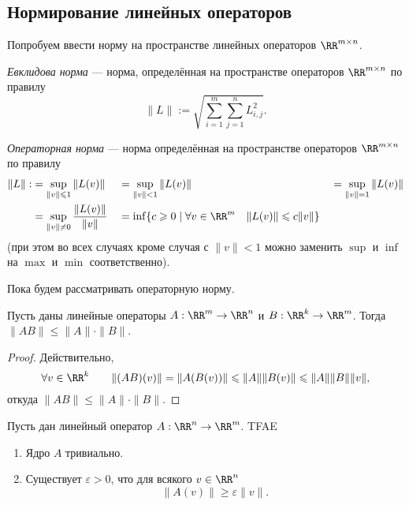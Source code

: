 \documentclass[12pt,a4paper]{article}
\begin{document}
    \subsection{Нормирование линейных операторов}

    Попробуем ввести норму на пространстве линейных операторов $\RR^{m \times n}$.

    \begin{definition}
        \emph{Евклидова норма} --- норма, определённая на пространстве операторов $\RR^{m \times n}$ по правилу
        \[\|L\| := \sqrt{\sum_{i=1}^m \sum_{j=1}^n L_{i,j}^2}.\]
    \end{definition}

    \begin{definition}
        \emph{Операторная норма} --- норма определённая на пространстве операторов $\RR^{m \times n}$ по правилу
        \begin{align*}
            \|L\|
            :&= \sup_{\|v\| \leqslant 1} \|L(v)\|&
            &= \sup_{\|v\| < 1} \|L(v)\|&
            &= \sup_{\|v\| = 1} \|L(v)\|\\
            &= \sup_{\|v\| \neq 0} \frac{\|L(v)\|}{\|v\|}&
            &= \inf \{c \geqslant 0 \mid \forall v \in \RR^m \quad \|L(v)\| \leqslant c\|v\|\}
        \end{align*}
        (при этом во всех случаях кроме случая с $\|v\| < 1$ можно заменить $\sup$ и $\inf$ на $\max$ и $\min$ соответственно).
    \end{definition}

    Пока будем рассматривать операторную норму.

    \begin{lemma}
        Пусть даны линейные операторы $A: \RR^m \to \RR^n$ и $B: \RR^k \to \RR^m$. Тогда $\|AB\| \leqslant \|A\| \cdot \|B\|$.
    \end{lemma}

    \begin{proof}
        Действительно,
        \[\forall v \in \RR^k \qquad \|(AB)(v)\| = \|A(B(v))\| \leqslant \|A\| \|B(v)\| \leqslant \|A\| \|B\| \|v\|,\]
        откуда $\|AB\| \leqslant \|A\| \cdot \|B\|$.
    \end{proof}

    \begin{lemma}
        Пусть дан линейный оператор $A: \RR^n \to \RR^m$. TFAE
        \begin{enumerate}
            \item Ядро $A$ тривиально.
            \item Существует $\varepsilon > 0$, что для всякого $v \in \RR^n$
                \[\|A(v)\| \geqslant \varepsilon \|v\|.\]
        \end{enumerate}
    \end{lemma}
\end{document}
